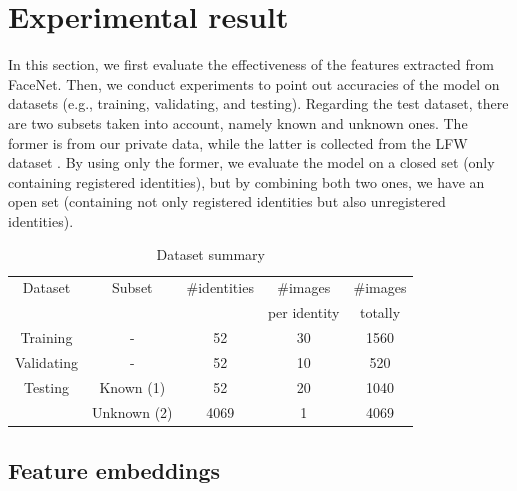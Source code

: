 \documentclass[journal, twocolumn]{IEEEtran}
\begin{document}
\medskip
\section{Experimental result}
\label{experimental-result}

In this section, we first evaluate the effectiveness of the features extracted from FaceNet. Then, we conduct experiments to point out accuracies of the model on datasets (e.g., training, validating, and testing). Regarding the test dataset, there are two subsets taken into account, namely known and unknown ones. The former is from our private data, while the latter is collected from the LFW dataset \cite{ref:data-lfw}. By using only the former, we evaluate the model on a closed set (only containing registered identities), but by combining both two ones, we have an open set (containing not only registered identities but also unregistered identities).


\begin{table}[h!]
\centering
	\caption{Dataset summary}
	\label{table:dataset}
		\begin{tabularx}{0.93\linewidth}{ccccc}
		\toprule
		Dataset  &  Subset  &  \#identities   &  \#images      &  \#images  \\
		~        &  ~       &  ~              &  per identity  &  totally  \\
		\midrule
		Training    &  -            &  52    &  30  &  1560  \\ 
		Validating  &  -            &  52    &  10  &  520  \\ 
		Testing     &  Known (1)    &  52    &  20  &  1040  \\
		~           &  Unknown (2)  &  4069  &  1   &  4069  \\
		\bottomrule
	\end{tabularx}
\end{table}


\subsection{Feature embeddings} 
\end{document}
